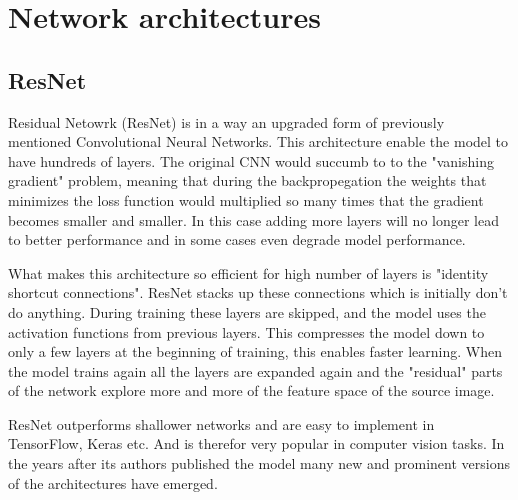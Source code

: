\documentclass[thesis.tex]{subfiles}
\begin{document}
\section{Network architectures} 



\subsection{ResNet}
Residual Netowrk (ResNet) \cite{DeepResidual16} is in a way an upgraded form of previously mentioned Convolutional Neural Networks. This architecture enable the model to have hundreds of layers. The original CNN would succumb to to the "vanishing gradient" problem, meaning that during the backpropegation the weights that minimizes the loss function would multiplied so many times that the gradient becomes smaller and smaller. In this case adding more layers will no longer lead to better performance and in some cases even degrade model performance. 

What makes this architecture so efficient for high number of layers is "identity shortcut connections". ResNet stacks up these connections which is initially don't do anything. During training these layers are skipped, and the model uses the activation functions from previous layers. This compresses the model down to only a few layers at the beginning of training, this enables faster learning. When the model trains again all the layers are expanded again and the "residual" parts of the network explore more and more of the feature space of the source image.


ResNet outperforms shallower networks and are easy to implement in TensorFlow, Keras etc. And is therefor very popular in computer vision tasks. In the years after its authors published the model many new and prominent versions of the architectures have emerged.

\end{document}
